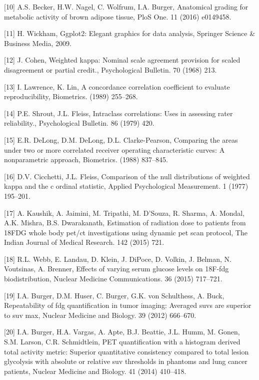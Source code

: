 \documentclass[]{elsarticle} %
\begin{document}
\hypertarget{ref-becker2016bat}{}
{[}10{]} A.S. Becker, H.W. Nagel, C. Wolfrum, I.A. Burger, Anatomical
grading for metabolic activity of brown adipose tissue, PloS One. 11
(2016) e0149458.

\hypertarget{ref-wickham2009ggplot2}{}
{[}11{]} H. Wickham, Ggplot2: Elegant graphics for data analysis,
Springer Science \& Business Media, 2009.

\hypertarget{ref-cohen1968weighted}{}
{[}12{]} J. Cohen, Weighted kappa: Nominal scale agreement provision for
scaled disagreement or partial credit., Psychological Bulletin. 70
(1968) 213.

\hypertarget{ref-lawrence1989concordance}{}
{[}13{]} I. Lawrence, K. Lin, A concordance correlation coefficient to
evaluate reproducibility, Biometrics. (1989) 255--268.

\hypertarget{ref-shrout1979intraclass}{}
{[}14{]} P.E. Shrout, J.L. Fleiss, Intraclass correlations: Uses in
assessing rater reliability., Psychological Bulletin. 86 (1979) 420.

\hypertarget{ref-delong1988roc}{}
{[}15{]} E.R. DeLong, D.M. DeLong, D.L. Clarke-Pearson, Comparing the
areas under two or more correlated receiver operating characteristic
curves: A nonparametric approach, Biometrics. (1988) 837--845.

\hypertarget{ref-cicchetti1977comparison}{}
{[}16{]} D.V. Cicchetti, J.L. Fleiss, Comparison of the null
distributions of weighted kappa and the c ordinal statistic, Applied
Psychological Measurement. 1 (1977) 195--201.

\hypertarget{ref-kaushik2015estimation}{}
{[}17{]} A. Kaushik, A. Jaimini, M. Tripathi, M. D'Souza, R. Sharma, A.
Mondal, A.K. Mishra, B.S. Dwarakanath, Estimation of radiation dose to
patients from 18FDG whole body pet/ct investigations using dynamic pet
scan protocol, The Indian Journal of Medical Research. 142 (2015) 721.

\hypertarget{ref-webb2015glucose}{}
{[}18{]} R.L. Webb, E. Landau, D. Klein, J. DiPoce, D. Volkin, J.
Belman, N. Voutsinas, A. Brenner, Effects of varying serum glucose
levels on 18F-fdg biodistribution, Nuclear Medicine Communications. 36
(2015) 717--721.

\hypertarget{ref-burger2012repeatability}{}
{[}19{]} I.A. Burger, D.M. Huser, C. Burger, G.K. von Schulthess, A.
Buck, Repeatability of fdg quantification in tumor imaging: Averaged
suvs are superior to suv max, Nuclear Medicine and Biology. 39 (2012)
666--670.

\hypertarget{ref-burger2014pet}{}
{[}20{]} I.A. Burger, H.A. Vargas, A. Apte, B.J. Beattie, J.L. Humm, M.
Gonen, S.M. Larson, C.R. Schmidtlein, PET quantification with a
histogram derived total activity metric: Superior quantitative
consistency compared to total lesion glycolysis with absolute or
relative suv thresholds in phantoms and lung cancer patients, Nuclear
Medicine and Biology. 41 (2014) 410--418.
\end{document}
